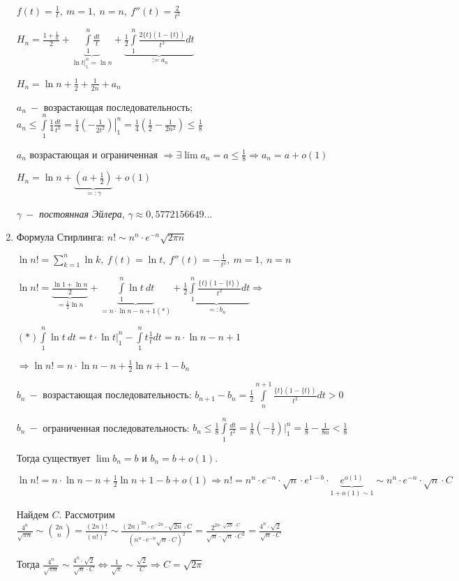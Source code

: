 \begin{example}
\begin{enumerate}
        $f(t)=\frac{1}{t},\ m=1,\ n=n,\ f''(t)=\frac{2}{t^3}$

        $H_n=\frac{1+\frac{1}{n}}{2}+\underbrace{\int\limits_1^n\frac{dt}{t}}_{\left.\ln t\right|_1^n=\ln n}+\underbrace{\frac{1}{2}\int\limits_1^n\frac{2\{t\}(1-\{t\})}{t^3}dt}_{:=a_n}$

        $H_n=\ln n + \frac{1}{2}+\frac{1}{2n}+a_n$

        $a_n\ -$ возрастающая последовательность; $a_n\leq \int\limits_1^n\frac{1}{4}\frac{dt}{t^3}=\left.\frac{1}{4}(-\frac{1}{2t^2})\right|_1^n=\frac{1}{4}(\frac{1}{2}-\frac{1}{2n^2})\leq \frac{1}{8}$

        $a_n$ возрастающая и ограниченная $\Rightarrow \exists \lim a_n=a\leq \frac{1}{8}\Rightarrow a_n=a+o(1)$

        $H_n=\ln n + \underbrace{(a+\frac{1}{2})}_{=:\gamma}+o(1)$

        $\gamma\ -$ \textit{постоянная Эйлера}, $\gamma\approx 0, 5772156649...$ 

        \item Формула Стирлинга: $n!\sim n^n\cdot e^{-n}\sqrt{2\pi n}$

        $\ln n!=\sum\limits_{k=1}^n\ln k,\ f(t)=\ln t,\ f''(t) =-\frac{1}{t^2},\ m=1,\ n=n$

        $\ln n!=\underbrace{\frac{\ln 1 + \ln n}{2}}_{=\frac{1}{2}\ln n}+\underbrace{\int\limits_1^n\ln t\ dt}_{=n\cdot \ln n - n+1 (*)}+\underbrace{\frac{1}{2}\int\limits_1^n \frac{\{t\}(1-\{t\})}{t^2}dt}_{=:b_n}\Rightarrow $

        $(*)\int\limits_1^n\ln t\ dt=t\cdot \ln t\left.\right|_1^n-\int\limits_1^n t\frac{1}{t} dt=n\cdot \ln n-n+1$

        $\Rightarrow \ln n!=n\cdot \ln n -n+\frac{1}{2}\ln n +1-b_n$

        $b_n\ -$ возрастающая последовательность: $b_{n+1}-b_n=\frac{1}{2}\int\limits_n^{n+1}\frac{\{t\}(1-\{t\})}{t^2} dt>0$

        $b_n\ -$ ограниченная последовательность: $b_n\leq\frac{1}{8}\int\limits_1^{n}\frac{dt}{t^2}=\frac{1}{8}(-\frac{1}{t})\left.\right|_1^n=\frac{1}{8}-\frac{1}{8n}<\frac{1}{8}$

        Тогда существует $\lim b_n=b$ и $b_n=b+o(1)$.

        $\ln n!=n\cdot \ln n - n + \frac{1}{2}\ln n+1-b+o(1)\Rightarrow n!=n^n\cdot e^{-n}\cdot\sqrt{n} \cdot e^{1-b}\cdot \underbrace{e^{o(1)}}_{1+o(1)\sim 1}\sim n^n\cdot e^{-n}\cdot\sqrt{n} \cdot C$

        Найдем $C$. Рассмотрим $\frac{4^n}{\sqrt{\pi n}}\sim\binom{2n}{n}=\frac{(2n)!}{(n!)^2}\sim\frac{(2n)^{2n}\cdot e^{-2n}\cdot\sqrt{2n}\cdot C}{(n^n\cdot e^{-n}\sqrt{n}\cdot C)^2}=\frac{2^{2n\cdot \sqrt{2n}\cdot C}}{\sqrt{n}\cdot \sqrt{n} \cdot C^2}=\frac{4^n\cdot\sqrt{2}}{\sqrt{n}\cdot C}$

        Тогда $\frac{4^n}{\sqrt{\pi n}}\sim \frac{4^n\cdot \sqrt{2}}{\sqrt{n}\cdot C}\Leftrightarrow \frac{1}{\sqrt{\pi}}\sim \frac{\sqrt{2}}{C}\Rightarrow C=\sqrt{2\pi}$
    \end{enumerate}
\end{example}